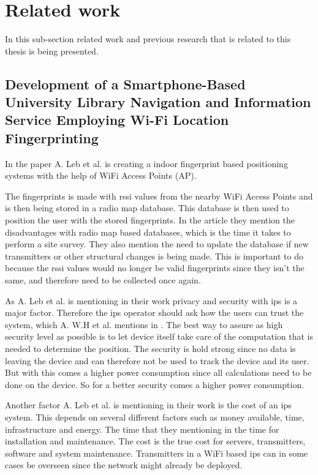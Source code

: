 \section{Related work}\label{sec:theoryRelatedWork}
In this sub-section related work and previous research that is related to this thesis is being presented.


\subsection{Development of a Smartphone-Based University Library Navigation and Information Service Employing Wi-Fi Location Fingerprinting}\label{sec:}
In the paper \cite{DevelopmentSmartphoneBasedUniversity2021} A. Leb et al. is creating a indoor fingerprint based positioning systems with the help of WiFi Access Points (AP).

\bigskip

The fingerprints is made with \acrshort{rssi} values from the nearby WiFi Access Points and is then being stored in a radio map database.
This database is then used to position the user with the stored fingerprints.
In the article they mention the disadvantages with radio map based databases, which is the time it takes to perform a site survey.
They also mention the need to update the database if new transmitters or other structural changes is being made.
This is important to do because the \acrshort{rssi} values would no longer be valid fingerprints since they isn't the same, and therefore need to be collected once again.

\bigskip

As A. Leb et al. is mentioning in their work privacy and security with \acrfull{ips} is a major factor.
Therefore the \acrshort{ips} operator should ask how the users can trust the system, which A. W.H et al. mentions in \cite{SurveyWirelessIndoor2019}.
The best way to assure as high security level as possible is to let  device itself take care of the computation that is needed to determine the position.
The security is hold strong since no data is leaving the device and can therefore not be used to track the device and its user.
But with this comes a higher power consumption since all calculations need to be done on the device.
So for a better security comes a higher power consumption.

\bigskip

Another factor A. Leb et al. is mentioning in their work is the cost of an \acrshort{ips} system.
This depends on several different factors such as money available, time, infrastructure and energy.
The time that they mentioning in the time for installation and maintenance.
The cost is the true cost for servers, transmitters, software and system maintenance.
Transmitters in a WiFi based \acrshort{ips} can in some cases be overseen since the network might already be deployed.

